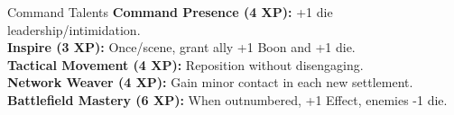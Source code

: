 \documentclass[10pt]{article}
\begin{document}
\begin{minipage}[t]{0.48\linewidth}
    \vspace{0.5em}
    
    \begin{charbox}{Command Talents}
        \textbf{Command Presence (4 XP):} +1 die leadership/intimidation.\\
        \textbf{Inspire (3 XP):} Once/scene, grant ally +1 Boon and +1 die.\\
        \textbf{Tactical Movement (4 XP):} Reposition without disengaging.\\
        \textbf{Network Weaver (4 XP):} Gain minor contact in each new settlement.\\
        \textbf{Battlefield Mastery (6 XP):} When outnumbered, +1 Effect, enemies -1 die.
    \end{charbox}
\end{minipage}
\hfill
\end{document}
